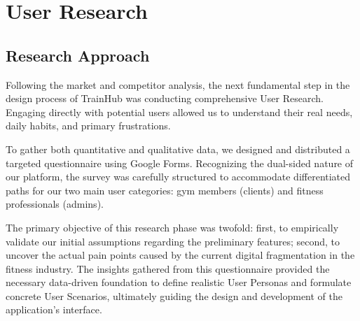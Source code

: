 \section{User Research}\label{sect:UserResearch}

\subsection{Research Approach}\label{subsect:UR_Introduction}
Following the market and competitor analysis, the next fundamental step in the design process of TrainHub was conducting comprehensive User Research. Engaging directly with potential users allowed us to understand their real needs, daily habits, and primary frustrations.

To gather both quantitative and qualitative data, we designed and distributed a targeted questionnaire using Google Forms. Recognizing the dual-sided nature of our platform, the survey was carefully structured to accommodate differentiated paths for our two main user categories: gym members (clients) and fitness professionals (admins). 

The primary objective of this research phase was twofold: first, to empirically validate our initial assumptions regarding the preliminary features; second, to uncover the actual pain points caused by the current digital fragmentation in the fitness industry. The insights gathered from this questionnaire provided the necessary data-driven foundation to define realistic User Personas and formulate concrete User Scenarios, ultimately guiding the design and development of the application's interface.





